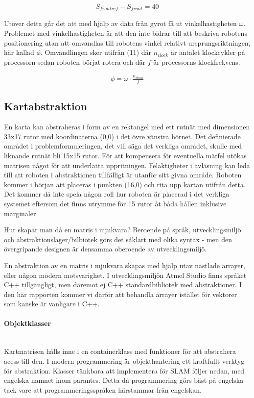 \documentclass[a4paper,12pt,fleqn]{article}
\begin{document}
\begin{gather}
	S_{frontref} - S_{front} = 40
\end{gather}

Utöver detta går det att med hjälp av data från gyrot få ut vinkelhastigheten $\omega$. Problemet med vinkelhastigheten är att den inte bidrar till att beskriva robotens positionering utan att omvandlas till robotens vinkel relativt ursprungsriktningen, här kallad $\phi$. Omvandlingen sker utifrån (11) där $n_{clock}$ är antalet klockcykler på processorn sedan roboten börjat rotera och där $f$ är processorns klockfrekvens.

\begin{gather}
	\phi = \omega \cdot \frac{n_{clock}}{f}
\end{gather} 

\subsection{Kartabstraktion}

En karta kan abstraheras i form av en rektangel med ett rutnät med dimensionen 33x17 rutor med koordinaterna (0,0) i det övre vänstra hörnet. Det definierade området i problemformuleringen, det vill säga det verkliga området, skulle med liknande rutnät bli 15x15 rutor. För att kompensera för eventuella mätfel utökas matrisen något för att underlätta uppritningen. Felaktigheter i avläsning kan leda till att roboten i abstraktionen tillfälligt är utanför sitt givna område. Roboten kommer i början att placeras i punkten (16,0) och rita upp kartan utifrån detta. Det kommer då inte spela någon roll hur roboten är placerad i det verkliga systemet eftersom det finns utrymme för 15 rutor åt båda hållen inklusive marginaler. 

Hur skapar man då en matris i mjukvara? Beroende på språk, utvecklingsmiljö och abstraktionslager/bilbiotek görs det såklart med olika syntax - men den övergripande designen är densamma oberoende av utvecklingsmiljö. 

En abstraktion av en matris i mjukvara skapas med hjälp utav nästlade arrayer, eller någon modern motsvarighet. I utvecklingsmiljön Atmel Studio finns språket C++ tillgängligt, men däremot ej C++ standardbibliotek med abstraktioner. I den här rapporten kommer vi därför att behandla arrayer istället för vektorer som kanske är vanligare i C++. 

\paragraph{Objektklasser}
~\\
Kartmatrisen hålls inne i en containerklass med funktioner för att abstrahera acess till den. I modern programmering är objekthantering ett kraftfullt verktyg för abstraktion. Klasser tänkbara att implementera för SLAM följer nedan, med engelska namnet inom parantes. Detta då programmering görs bäst på engelska tack vare att programmeringsspråken härstammar från engelskan. 
\end{document}
